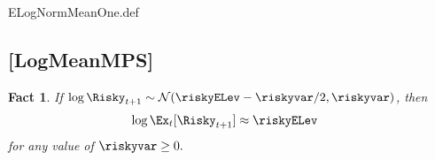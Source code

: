 \message{ !name(MathFactsList.tex)}\documentclass{handout}
\newtheorem{Fact}{Fact}
\begin{document}
\begin{verbatimwrite}{ELogNormMeanOne.def}
\providecommand{\ELogNormMeanOne}{\href{https://www.econ2.jhu.edu/people/ccarroll/public/LectureNotes/MathFacts/MathFactsList\#ArithmeticVSGeometric}{\ensuremath{\mathtt{[ArithmeticVSGeometric]}}}}
\end{verbatimwrite}


\begin{comment} %
\hypertarget{MeanOne}{}
\subsection{[MeanOne]}

\begin{Fact} If $\log \Risky_{t+1} \sim \mathcal{N}(-\riskyvar/2,\riskyvar)$, then
\begin{equation}\begin{gathered}\begin{aligned}
        \Ex_{t}[\Risky_{t+1}] & =  1
\end{aligned}\end{gathered}\end{equation}
\end{Fact}

This follows from substituting $- \riskyvar/2$ for $\mu$ in \ELogNorm.

\begin{verbatimwrite}{MeanOne.def}
\providecommand{\MeanOne}{\href{https://www.econ2.jhu.edu/people/ccarroll/public/LectureNotes/MathFacts/MathFactsList\#MeanOne}{\ensuremath{\mathtt{[MeanOne]}}}}
\end{verbatimwrite}
\end{comment}

\hypertarget{LogMeanMPS}{}
\subsection{[LogMeanMPS]}

\begin{Fact} If $\log \Risky_{t+1} \sim \mathcal{N}(\null{\riskyELev}-\riskyvar/2,\riskyvar)$, then
\begin{equation}\begin{gathered}\begin{aligned}
      \log  \Ex_{t}[\Risky_{t+1}] & \approx  \riskyELev
\end{aligned}\end{gathered}\end{equation}
for any value of $\riskyvar \geq 0.$
\end{Fact}
\end{document}
